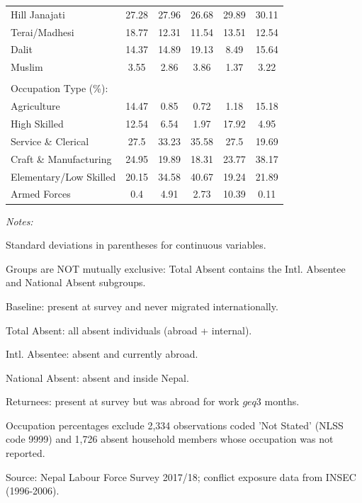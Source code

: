 \begin{landscape}
\begin{table}[!h]
{\begin{threeparttable}
\begin{tabular}[t]{lccccc}
Hill Janajati & 27.28 & 27.96 & 26.68 & 29.89 & 30.11\\
Terai/Madhesi & 18.77 & 12.31 & 11.54 & 13.51 & 12.54\\
Dalit & 14.37 & 14.89 & 19.13 & 8.49 & 15.64\\
\addlinespace
Muslim & 3.55 & 2.86 & 3.86 & 1.37 & 3.22\\
 &  &  &  &  & \\
Occupation Type (\%): &  &  &  &  & \\
Agriculture & 14.47 & 0.85 & 0.72 & 1.18 & 15.18\\
High Skilled & 12.54 & 6.54 & 1.97 & 17.92 & 4.95\\
\addlinespace
Service \& Clerical & 27.5 & 33.23 & 35.58 & 27.5 & 19.69\\
Craft \& Manufacturing & 24.95 & 19.89 & 18.31 & 23.77 & 38.17\\
Elementary/Low Skilled & 20.15 & 34.58 & 40.67 & 19.24 & 21.89\\
Armed Forces & 0.4 & 4.91 & 2.73 & 10.39 & 0.11\\
\bottomrule
\end{tabular}
\begin{tablenotes}
\item \textit{Notes:} 
\item Standard deviations in parentheses for continuous variables.
\item Groups are NOT mutually exclusive: Total Absent contains the Intl. Absentee and National Absent subgroups.
\item Baseline: present at survey and never migrated internationally.
\item Total Absent: all absent individuals (abroad + internal).
\item Intl. Absentee: absent and currently abroad.
\item National Absent: absent and inside Nepal.
\item Returnees: present at survey but was abroad for work $geq$3 months.
\item Occupation percentages exclude 2,334 observations coded 'Not Stated' (NLSS code 9999) and 1,726 absent household members whose occupation was not reported.
\item Source: Nepal Labour Force Survey 2017/18; conflict exposure data from INSEC (1996-2006).
\end{tablenotes}
\end{threeparttable}}
\end{table}
\end{landscape}
